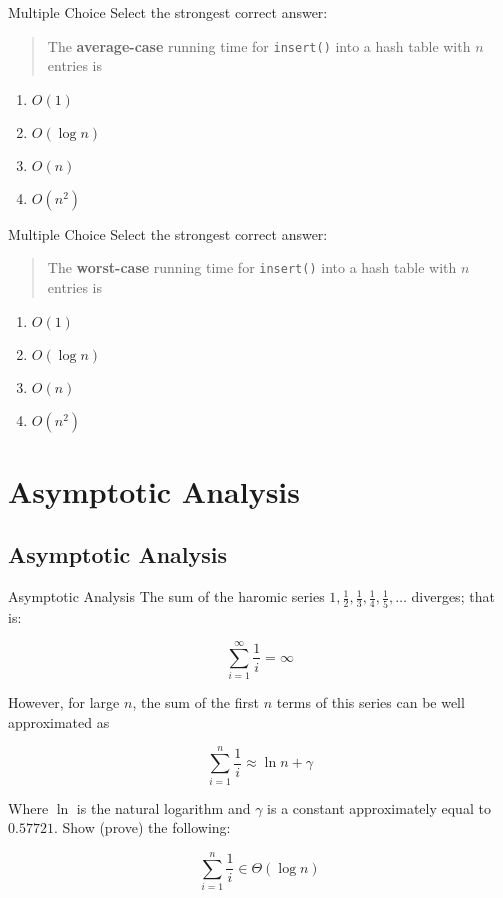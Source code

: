 \documentclass[9pt]{beamer}
\begin{document}
\begin{frame}[fragile]{Multiple Choice}
  Select the strongest correct answer:

  \begin{quote}
    The {\bf average-case} running time for {\tt insert()} into a hash table
    with $n$ entries is
  \end{quote}

  \begin{enumerate}
    \item
      \alert<2>{$O(1)$}
    \item
      $O(\log{n})$
    \item
      $O(n)$
    \item
      $O(n^2)$
  \end{enumerate}
\end{frame}

\begin{frame}[fragile]{Multiple Choice}
  Select the strongest correct answer:

  \begin{quote}
    The {\bf worst-case} running time for {\tt insert()} into a hash table
    with $n$ entries is
  \end{quote}

  \begin{enumerate}
    \item
      $O(1)$
    \item
      $O(\log{n})$
    \item
      \alert<2>{$O(n)$}
    \item
      $O(n^2)$
  \end{enumerate}
\end{frame}

\section{Asymptotic Analysis}
\subsection{Asymptotic Analysis}
\begin{frame}[fragile]{Asymptotic Analysis}
  The sum of the haromic series $1, \frac{1}{2}, \frac{1}{3}, \frac{1}{4},
  \frac{1}{5}, \dots$ diverges; that is:

  \[\sum_{i=1}^\infty \frac{1}{i} = \infty\]

  However, for large $n$, the sum of the first $n$ terms of this series can
  be well approximated as

  \[\sum_{i=1}^n \frac{1}{i} \approx \ln{n} + \gamma\]

  Where $\ln$ is the natural logarithm and $\gamma$ is a constant
  approximately equal to $0.57721$. Show (prove) the following:

  \[\sum_{i=1}^n \frac{1}{i} \in \Theta(\log{n})\]
\end{frame}
\end{document}
